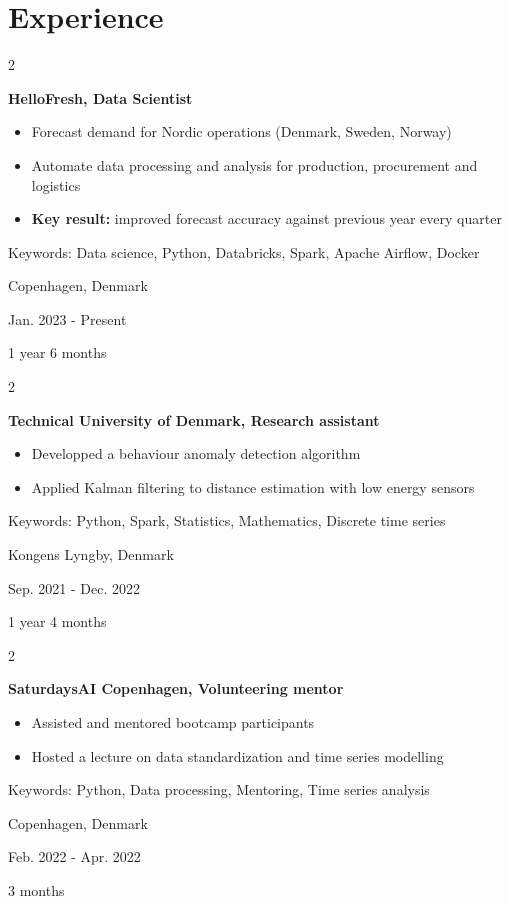 \documentclass[10pt, letterpaper]{article}
\newenvironment{highlights}{
    \begin{itemize}[
        topsep=0.10 cm,
        parsep=0.10 cm,
        partopsep=0pt,
        itemsep=0pt,
        leftmargin=0.4 cm + 10pt
    ]
}{
    \end{itemize}
} %
\newenvironment{twocolentry}[2][]{
    \onecolentry
    \def\secondColumn{#2}
    \setcolumnwidth{\fill, 4.5 cm}
    \begin{paracol}{2}
}{
    \switchcolumn \raggedleft \secondColumn
    \end{paracol}
    \endonecolentry
} %
\begin{document}
    
    \section{Experience}

        \begin{twocolentry}{
        Copenhagen, Denmark

        Jan. 2023 - Present

        1 year 6 months

        }
            \textbf{HelloFresh, Data Scientist}
            \begin{highlights}
                \item Forecast demand for Nordic operations (Denmark, Sweden, Norway)
                \item Automate data processing and analysis for production, procurement and logistics
                \item \textbf{Key result:} improved forecast accuracy against previous year every quarter
            \end{highlights}
            Keywords: Data science, Python, Databricks, Spark, Apache Airflow, Docker
        \end{twocolentry}

        \vspace{0.5 cm}

        \begin{twocolentry}{
        Kongens Lyngby, Denmark

        Sep. 2021 - Dec. 2022

        1 year 4 months

        }
            \textbf{Technical University of Denmark, Research assistant}
            \begin{highlights}
                \item Developped a behaviour anomaly detection algorithm
                \item Applied Kalman filtering to distance estimation with low energy sensors
            \end{highlights}
            Keywords: Python, Spark, Statistics, Mathematics, Discrete time series
        \end{twocolentry}

        \vspace{0.5 cm}

        \begin{twocolentry}{
        Copenhagen, Denmark

        Feb. 2022 - Apr. 2022

        3 months

        }
        \textbf{SaturdaysAI Copenhagen, Volunteering mentor}
        \begin{highlights}
            \item Assisted and mentored bootcamp participants
            \item Hosted a lecture on data standardization and time series modelling 
        \end{highlights}
        Keywords: Python, Data processing, Mentoring, Time series analysis
        \end{twocolentry}
\end{document}
